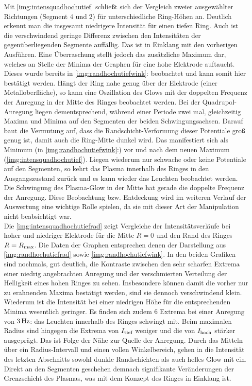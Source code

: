         Mit \autoref{img:intensquadhochutief} schließt sich der Vergleich zweier ausgewählter Richtungen (Segment 4 und 2) für unterschiedliche Ring-Höhen an. Deutlich erkennt man die insgesamt niedrigere Intensität für einen tiefen Ring. Auch ist die verschwindend geringe Differenz zwischen den Intensitäten der gegenüberliegenden Segmente auffällig. Das ist in Einklang mit den vorherigen Ausführen. Eine Überraschung stellt jedoch das zusätzliche Maximum dar, welches an Stelle der Minima der Graphen für eine hohe Elektrode auftaucht. Dieses wurde bereits in \autoref{img:randhochutiefwink}:\underline{} beobachtet und kann somit hier bestätigt werden. Hängt der Ring nahe genug über der Elektrode (einer Metalloberfläche), so kann eine Oszillation des Glows mit der doppelten Frequenz der Anregung in der Mitte des Ringes beobachtet werden. Bei der Quadrupol-Anregung liegen dementsprechend, während einer Periode zwei mal, gleichzeitig Maxima und Minima auf den Segmenten der beiden Schwingungsachsen. Darauf baut die Vermutung auf, dass die Randschicht-Verformung dieser Potentiale groß genug ist, damit auch die Ring-Mitte dunkel wird. Das manifestiert sich als Minimum (in \autoref{img:randhochutiefwink}:\underline{}) vor und nach dem neuen Maximum (\autoref{img:intensquadhochutief}). Liegen wiederum nur schwache oder keine Potentiale auf den Segmenten, so kehrt das Plasma innerhalb des Ringes in den Ausgangszustand zurück und es kann wieder das Leuchten beobachtet werden. Die Schwingung des Plasma-Glow in der Mitte hat gerade die doppelte Frequenz der Anregung. Diese Beobachtung bzw. Entdeckung wird im weiteren Verlauf der Auswertung eine wichtige Rolle spielen, da sie mit dieser Art der Manipulation nicht beabsichtigt war.\\
        Die \autoref{img:intensquadhochutiefrad} zeigt Vergleiche der Intensitätsverläufe bei hoher und niedriger Elektrode für die Mitte $R=0$ und den Rand des Ringes $R=R_\text{max}$. Die Daten der Graphen entsprechen denen der Darstellung aus \autoref{img:randhochutiefrad} sowie \autoref{img:randhochutiefwink}. In den beiden Grafiken sind nochmals, gut deutlich, die Kontraste zwischen den sehr scharfen Extrema einer niedrig angebrachten Anregung und der verschmierten Verteilung der Helligkeit eines hohen Ringes zu sehen. Insbesondere können damit die vorher nur zu erahnenden Maxima bestätigt werden, sind sie dennoch verschwindend klein. Wiederum ist die Intensität bei einer niedrigen Höhe für die entsprechenden Minima wesentlich geringer. Es finden sich zudem 6 Extrema bei einer Anregung von $\unit[3]{Hz}$: das Leuchten innerhalb des Ringes schwingt mit. Beim maximalen Radius sind hingegen die Extrema von $I_\text{tief}$ weniger und die von $I_\text{hoch}$ stärker ausgeprägt. Das ist Folge der Nähe zur Quelle der Anregung. Durch das Mitteln über ein Radius-Intervall und einen vollen Winkelbereich, gehen in die Intensität des letzten Abschnitts sowohl dunkle Randschichten als auch helles Glow mit ein. Direkt an den Segmenten geschehen demnach signifikante Veränderungen der Grenzschicht des Plasmas, was mit dem Konzept des Ringes in Einklang ist.

